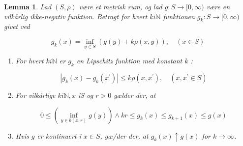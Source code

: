 \documentclass{article}
\newcommand{\1}{\mathbbm{1}}
\theoremstyle{boxed}
\newtheorem{lemma}[theorem]{Lemma}
\begin{document}
\begin{theorem-box}
    \begin{lemma}
        Lad $(S, \rho)$ være et metrisk rum, og lad $g: S \rightarrow[0, \infty)$ være en vilkårlig ikke-negativ funktion. Betragt for hvert $k i \mathbb{N}$ funktionen $g_k: S \rightarrow[0, \infty)$ givet ved

$$
g_k(x)=\inf _{y \in S}(g(y)+k \rho(x, y)), \quad(x \in S)
$$
\begin{enumerate}
    \item[\textnormal{(i)}] For hvert $k i \mathbb{N}$ er $g_k$ en Lipschitz funktion med konstant $k$ :

    $$
    \left|g_k(x)-g_k\left(x^{\prime}\right)\right| \leq k \rho\left(x, x^{\prime}\right), \quad\left(x, x^{\prime} \in S\right)
    $$
    \item[\textnormal{(ii)}] For vilkårlige $k i \mathbb{N}, x$ iS og $r>0$ gælder der, at

    $$
    0 \leq\left(\inf _{y \in b(x, r)} g(y)\right) \wedge k r \leq g_k(x) \leq g_{k+1}(x) \leq g(x)
    $$
    \item[\textnormal{(iii)}] Hvis $g$ er kontinuert i $x \in S$, gæ/der der, at $g_k(x) \uparrow g(x)$ for $k \rightarrow \infty$.
\end{enumerate}
    \end{lemma}
\end{theorem-box}
\end{document}
